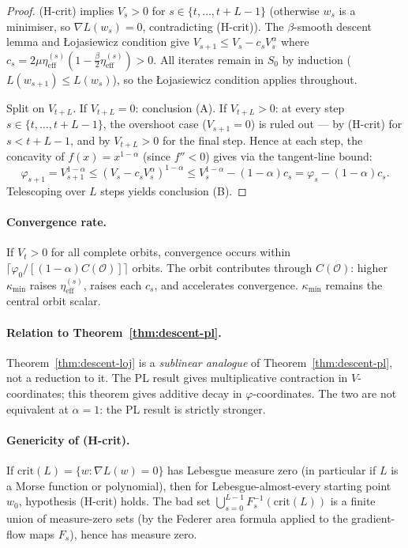 \documentclass[11pt]{article}
\theoremstyle{definition}
\theoremstyle{remark}
\newcommand{\etaeff}{\eta_{\mathrm{eff}}}
\newcommand{\kmin}{\kappa_{\min}}
\begin{document}
\begin{proof}
(H-crit) implies $V_s>0$ for $s\in\{t,\ldots,t+L-1\}$ (otherwise $w_s$ is a
minimiser, so $\nabla L(w_s)=0$, contradicting (H-crit)). The $\beta$-smooth descent
lemma and \L{}ojasiewicz condition give $V_{s+1}\leq V_s - c_s V_s^\alpha$ where
$c_s=2\mu\etaeff^{(s)}(1-\tfrac{\beta}{2}\etaeff^{(s)})>0$. All iterates remain in
$S_0$ by induction ($L(w_{s+1})\leq L(w_s)$), so the \L{}ojasiewicz condition
applies throughout.

Split on $V_{t+L}$. If $V_{t+L}=0$: conclusion (A). If $V_{t+L}>0$: at every step
$s\in\{t,\ldots,t+L-1\}$, the overshoot case ($V_{s+1}=0$) is ruled out --- by
(H-crit) for $s<t+L-1$, and by $V_{t+L}>0$ for the final step. Hence at each step,
the concavity of $f(x)=x^{1-\alpha}$ (since $f''<0$) gives via the tangent-line bound:
\[
  \varphi_{s+1} = V_{s+1}^{1-\alpha}
  \leq (V_s - c_s V_s^\alpha)^{1-\alpha}
  \leq V_s^{1-\alpha} - (1-\alpha)c_s
  = \varphi_s - (1-\alpha)c_s.
\]
Telescoping over $L$ steps yields conclusion (B).
\end{proof}

\paragraph{Convergence rate.}
If $V_t>0$ for all complete orbits, convergence occurs within
$\lceil\varphi_0/[(1-\alpha)C(\mathcal{O})]\rceil$ orbits. The orbit contributes
through $C(\mathcal{O})$: higher $\kmin$ raises $\etaeff^{(s)}$, raises each $c_s$,
and accelerates convergence. $\kmin$ remains the central orbit scalar.

\paragraph{Relation to Theorem~\ref{thm:descent-pl}.}
Theorem~\ref{thm:descent-loj} is a \emph{sublinear analogue} of
Theorem~\ref{thm:descent-pl}, not a reduction to it. The PL result gives
multiplicative contraction in $V$-coordinates; this theorem gives additive decay in
$\varphi$-coordinates. The two are not equivalent at $\alpha=1$: the PL result is
strictly stronger.

\paragraph{Genericity of (H-crit).}
If $\mathrm{crit}(L)=\{w:\nabla L(w)=0\}$ has Lebesgue measure zero (in particular
if $L$ is a Morse function or polynomial), then for Lebesgue-almost-every starting
point $w_0$, hypothesis (H-crit) holds. The bad set
$\bigcup_{s=0}^{L-1}F_s^{-1}(\mathrm{crit}(L))$ is a finite union of measure-zero
sets (by the Federer area formula applied to the gradient-flow maps $F_s$), hence
has measure zero.
\end{document}
